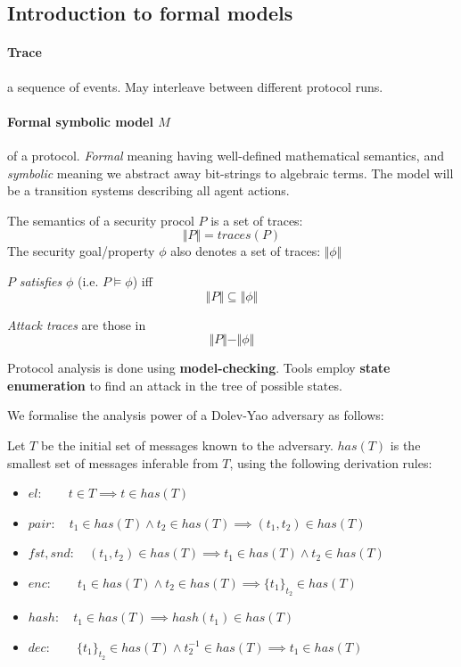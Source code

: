 \subsection{Introduction to formal models} \label{formal_models}

\paragraph{Trace} a sequence of events. May interleave between different protocol runs.

\paragraph{Formal symbolic model $M$} of a protocol. \textit{Formal} meaning having well-defined mathematical semantics, and \textit{symbolic} meaning we abstract away bit-strings to algebraic terms. The model will be a transition systems describing all agent actions.

The semantics of a security procol $P$ is a set of traces:
$$ \Vert P \Vert = traces(P)$$
The security goal/property $\phi$ also denotes a set of traces: $ \Vert \phi \Vert $

$P$ \textit{satisfies} $\phi$ (i.e.  $P \models \phi $) iff
$$ \Vert P \Vert \subseteq \Vert \phi \Vert $$

\textit{Attack traces} are those in
$$ \Vert P \Vert - \Vert \phi \Vert $$

Protocol analysis is done using \textbf{model-checking}. Tools employ \textbf{state enumeration} to find an attack in the tree of possible states.

\horizontaldivider

We formalise the analysis power of a Dolev-Yao adversary as follows:

Let $T$ be the initial set of messages known to the adversary. $has(T)$ is the smallest set of messages inferable from $T$, using the following derivation rules:

\begin{itemize}
    \item $el: \qquad t \in T \implies t \in has(T) $
    \item $pair: \quad t_1 \in has(T) \land t_2 \in has(T) \implies (t_1, t_2) \in has(T) $
    \item $fst,snd: \quad (t_1, t_2) \in has(T) \implies t_1 \in has(T) \land t_2 \in has(T) $
    \item $enc: \qquad t_1 \in has(T) \land t_2 \in has(T) \implies \{ t_1 \}_{t_2} \in has(T) $
    \item $hash: \quad t_1 \in has(T) \implies hash(t_1) \in has(T) $
    \item $dec: \qquad \{ t_1 \}_{t_2} \in has(T) \land t_2^{-1} \in has(T) \implies t_1 \in has(T) $
\end{itemize}


